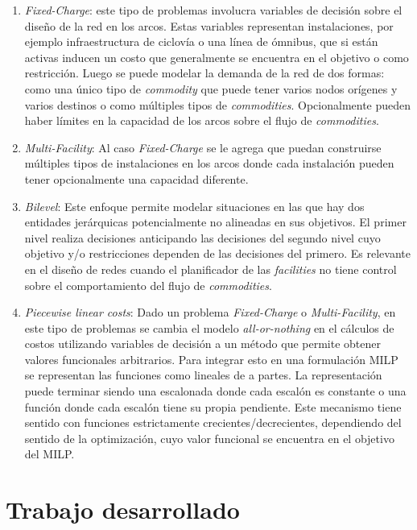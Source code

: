   \begin{enumerate}
    \item{{\it Fixed-Charge}: este tipo de problemas involucra variables de decisión sobre el diseño de la red en los arcos. Estas variables representan instalaciones, por ejemplo infraestructura de ciclovía o una línea de ómnibus, que si están activas inducen un costo que generalmente se encuentra en el objetivo o como restricción. Luego se puede modelar la demanda de la red de dos formas: como una único tipo de {\it commodity} que puede tener varios nodos orígenes y varios destinos o como múltiples tipos de {\it commodities}. Opcionalmente pueden haber límites en la capacidad de los arcos sobre el flujo de {\it commodities}.}
    \item{{\it Multi-Facility}: Al caso {\it Fixed-Charge} se le agrega que puedan construirse múltiples tipos de instalaciones en los arcos donde cada instalación pueden tener opcionalmente una capacidad diferente.}
    \item{{\it Bilevel}: Este enfoque permite modelar situaciones en las que hay dos entidades jerárquicas potencialmente no alineadas en sus objetivos. El primer nivel realiza decisiones anticipando las decisiones del segundo nivel cuyo objetivo y/o restricciones dependen de las decisiones del primero. Es relevante en el diseño de redes cuando el planificador de las {\it facilities} no tiene control sobre el comportamiento del flujo de {\it commodities}.}
    \item{{\it Piecewise linear costs}: Dado un problema {\it Fixed-Charge} o {\it Multi-Facility}, en este tipo de problemas se cambia el modelo {\it all-or-nothing} en el cálculos de costos utilizando variables de decisión a un método que permite obtener valores funcionales arbitrarios. Para integrar esto en una formulación MILP se representan las funciones como lineales de a partes. La representación puede terminar siendo una escalonada donde cada escalón es constante o una función donde cada escalón tiene su propia pendiente. Este mecanismo tiene sentido con funciones estrictamente crecientes/decrecientes, dependiendo del sentido de la optimización, cuyo valor funcional se encuentra en el objetivo del MILP.}
  \end{enumerate}

  \section{Trabajo desarrollado}

